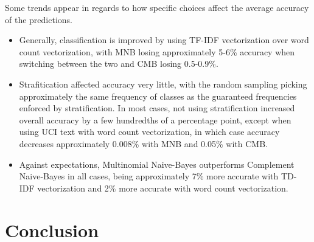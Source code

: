 \documentclass[conference]{IEEEtran}
\begin{document}
Some trends appear in regards to how specific choices affect the average accuracy of the predictions.
\begin{itemize}
\item Generally, classification is improved by using TF-IDF vectorization over word count vectorization, with MNB losing approximately 5-6\% accuracy when switching between the two and CMB losing 0.5-0.9\%.
\item Strafitication affected accuracy very little, with the random sampling picking approximately the same frequency of classes as the guaranteed frequencies enforced by stratification. In most cases, not using stratification increased overall accuracy by a few hundredths of a percentage point, except when using UCI text with word count vectorization, in which case accuracy decreases approximately 0.008\% with MNB and 0.05\% with CMB.
\item Against expectations, Multinomial Naive-Bayes outperforms Complement Naive-Bayes in all cases, being approximately 7\% more accurate with TD-IDF vectorization and 2\% more accurate with word count vectorization.
\end{itemize}

\section{Conclusion}

\end{document}
